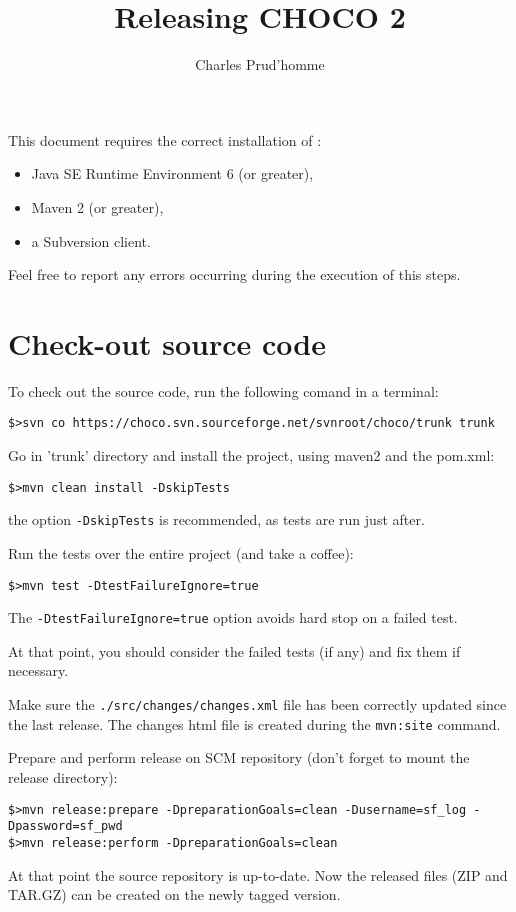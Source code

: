 \documentclass[11pt]{amsart}
\title{Releasing CHOCO 2}
\author{Charles Prud'homme}
\newcommand{\mylst}[1]{\lstinline|#1|}
\begin{document}
\maketitle

This document requires the correct installation of :
\begin{itemize}
\item Java SE Runtime Environment 6 (or greater),
\item Maven 2 (or greater),
\item a Subversion client.
\end{itemize}

Feel free to report any errors occurring during the execution of this steps.

\section{Check-out source code}

To check out the source code, run the following comand in a terminal:
\begin{lstlisting}
$>svn co https://choco.svn.sourceforge.net/svnroot/choco/trunk trunk
\end{lstlisting}

\vspace{.5cm}
Go in 'trunk' directory and install the project, using maven2 and the pom.xml:
\begin{lstlisting}
$>mvn clean install -DskipTests
\end{lstlisting}
the option \mylst{-DskipTests} is recommended, as tests are run just after. 

\vspace{.5cm}
Run the tests over the entire project (and take a coffee):
\begin{lstlisting}
$>mvn test -DtestFailureIgnore=true
\end{lstlisting}
The \mylst{-DtestFailureIgnore=true} option avoids hard stop on a failed test. 

At that point, you should consider the failed tests (if any) and fix them if necessary. 

\vspace{.5cm}
Make sure the \mylst{./src/changes/changes.xml} file has been correctly updated since the last release. The changes html file is created during the \mylst{mvn:site} command. 

\vspace{.5cm}
Prepare and perform release on SCM repository (don't forget to mount the release directory):
\begin{lstlisting}
$>mvn release:prepare -DpreparationGoals=clean -Dusername=sf_log -Dpassword=sf_pwd
$>mvn release:perform -DpreparationGoals=clean
\end{lstlisting}
At that point the source repository is up-to-date. Now the released files (ZIP and TAR.GZ) can be created on the newly tagged version.
\end{document}
